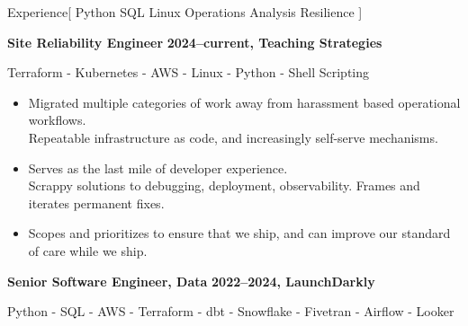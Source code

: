 \documentclass[11pt,a4paper]{article}
\begin{document}
\sloppy  %


\vspace{1em}

\begin{mysection}{Experience}[
    Python
    \textbullet{} SQL
    \textbullet{} Linux
    \textbullet{} Operations
    \textbullet{} Analysis
    \textbullet{} Resilience
]

  \begin{addmargin}[0.5em]{0em}
    {\large\bfseries Site Reliability Engineer}%
    \hfill {\bfseries 2024--current, Teaching Strategies}
    \begin{adjustwidth}{1ex}{0ex}
    Terraform - Kubernetes - AWS - Linux - Python - Shell Scripting


    \begin{itemize}
        [label=-, topsep=0pt, itemsep=0.5ex, parsep=0pt, leftmargin=1em]

    \item Migrated multiple categories of work away from harassment based operational workflows.
    \\    Repeatable infrastructure as code, and increasingly self-serve mechanisms.
    \item Serves as the last mile of developer experience.
    \\    Scrappy solutions to debugging, deployment, observability.
          Frames and iterates permanent fixes.
    \item Scopes and prioritizes to ensure that we ship, and can improve our standard of care while we ship.

    \end{itemize}

  \end{adjustwidth}
\end{addmargin}
\medskip

  \begin{addmargin}[0.5em]{0em}
    {\large\bfseries Senior Software Engineer, Data}%
    \hfill {\bfseries 2022--2024, LaunchDarkly}%
    \begin{adjustwidth}{1ex}{0ex}
      Python - SQL - AWS - Terraform - dbt - Snowflake - Fivetran - Airflow
      - Looker


\end{adjustwidth}
\end{addmargin}
\end{mysection}
\end{document}
